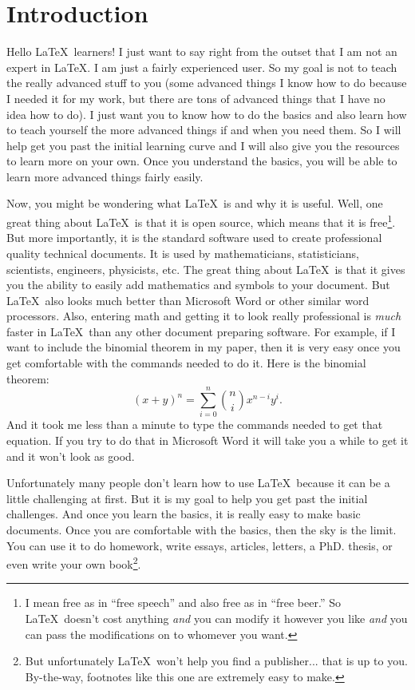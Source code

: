 \documentclass[11pt]{article}
\begin{document}
\section{Introduction}
Hello \LaTeX\ learners!  I just want to say right from the outset that I am not an expert in \LaTeX.  I am just a fairly experienced user.  So my goal is not to teach the really advanced stuff to you (some advanced things I know how to do because I needed it for my work, but there are tons of advanced things that I have no idea how to do).  I just want you to know how to do the basics and also learn how to teach yourself the more advanced things if and when you need them.  So I will help get you past the initial learning curve and I will also give you the resources to learn more on your own.  Once you understand the basics, you will be able to learn more advanced things fairly easily.

Now, you might be wondering what \LaTeX\ is and why it is useful. Well, one great thing about \LaTeX\ is that it is open source, which means that it is free\footnote{I mean free as in ``free speech'' and also free as in ``free beer.''  So \LaTeX\ doesn't cost anything \emph{and} you can modify it however you like \emph{and} you can pass the modifications on to whomever you want.}.  But more importantly, it is the standard software used to create professional quality technical documents.   It is used by mathematicians, statisticians, scientists, engineers, physicists, etc. The great thing about \LaTeX\ is that it gives you the ability to easily add mathematics and symbols to your document. But \LaTeX\ also looks much better than Microsoft Word or other similar word processors. Also, entering math and getting it to look really professional is \emph{much} faster in \LaTeX\ than any other document preparing software.  For example, if I want to include the binomial theorem in my paper, then it is very easy once you get comfortable with the commands needed to do it. Here is the binomial theorem:
\[
(x+y)^n=\sum_{i=0}^{n} \binom{n}{i} x^{n-i}y^i.
\]
And it took me less than a minute to type the commands needed to get that equation. If you try to do that in Microsoft Word it will take you a while to get it and it won't look as good.

Unfortunately many people don't learn how to use \LaTeX\ because it can be a little challenging at first.  But it is my goal to help you get past the initial challenges. And once you learn the basics, it is really easy to make basic documents. Once you are comfortable with the basics, then the sky is the limit.  You can use it to do homework, write essays, articles, letters, a PhD. thesis, or even write your own book\footnote{But unfortunately \LaTeX\ won't help you find a publisher... that is up to you.  By-the-way, footnotes like this one are extremely easy to make.}.
\end{document}
